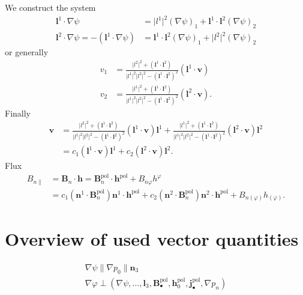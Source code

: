 \documentclass[a4paper, 10pt, english]{article}
\let\temp\vartheta
\let\vartheta\theta
\let\theta\temp
\let\temp\varphi
\let\varphi\phi
\let\phi\temp
\let\vec\symbf
\newcommand*\pol{\ensuremath{\textrm{pol}}}
\begin{document}
We construct the system
\begin{align*}
  \vec{l}^{1} \cdot \nabla \psi &= \lvert l^{1} \rvert^{2} (\nabla \psi)_{1} + \vec{l}^{1} \cdot \vec{l}^{2} (\nabla \psi)_{2} \\
  \vec{l}^{2} \cdot \nabla \psi = -(\vec{l}^{1} \cdot \nabla \psi) &= \vec{l}^{1} \cdot \vec{l}^{2} (\nabla \psi)_{1} + \lvert l^{2} \rvert^{2} (\nabla \psi)_{2}
\end{align*}
or generally
\begin{align*}
  v_{1} &= \frac{\lvert l^{2} \rvert^{2} + (\vec{l}^{1} \cdot \vec{l}^{2})}{\lvert l^{1} \rvert^{2} \lvert l^{2} \rvert^{2} - (\vec{l}^{1} \cdot \vec{l}^{2})^{2}} (\vec{l}^{1} \cdot \vec{v}) \\
  v_{2} &= \frac{\lvert l^{1} \rvert^{2} + (\vec{l}^{1} \cdot \vec{l}^{2})}{\lvert l^{1} \rvert^{2} \lvert l^{2} \rvert^{2} - (\vec{l}^{1} \cdot \vec{l}^{2})^{2}} (\vec{l}^{2} \cdot \vec{v}).
\end{align*}
Finally
\begin{align}
  \vec{v} &= \frac{\lvert l^{2} \rvert^{2} + (\vec{l}^{1} \cdot \vec{l}^{2})}{\lvert l^{1} \rvert^{2} \lvert l^{2} \rvert^{2} - (\vec{l}^{1} \cdot \vec{l}^{2})^{2}}(\vec{l}^{1} \cdot \vec{v}) \vec{l}^{1} + \frac{\lvert l^{1} \rvert^{2} + (\vec{l}^{1} \cdot \vec{l}^{2})}{\lvert l^{1} \rvert^{2} \lvert l^{2} \rvert^{2} - (\vec{l}^{1} \cdot \vec{l}^{2})^{2}}(\vec{l}^{2} \cdot \vec{v}) \vec{l}^{2} \\
  &= c_{1} (\vec{l}^{1} \cdot \vec{v}) \vec{l}^{1} + c_{2} (\vec{l}^{2} \cdot \vec{v}) \vec{l}^{2}.
\end{align}
Flux
\begin{align}
  B_{n \parallel} &= \vec{B}_{n} \cdot \vec{h} = \vec{B}_{n}^{\pol} \cdot \vec{h}^{\pol} + B_{n \phi} h^{\phi} \nonumber \\
  &= c_{1} (\vec{n}^{1} \cdot \vec{B}_{n}^{\pol}) \vec{n}^{1} \cdot \vec{h}^{\pol} + c_{2} (\vec{n}^{2} \cdot \vec{B}_{n}^{\pol}) \vec{n}^{2} \cdot \vec{h}^{\pol} + B_{n (\phi)} h_{(\phi)}.
\end{align}

\appendix
\section{Overview of used vector quantities}
\begin{gather*}
  \nabla \psi \parallel \nabla p_0 \parallel \vec{n}_3 \\
  \nabla \phi \perp \left( \nabla \psi, \dotsc, \vec{l}_3, \vec{B}_{\bullet}^{\pol}, \vec{h}_{0}^{\pol}, \vec{j}_{\bullet}^{\pol}, \nabla p_n \right)
\end{gather*}
\end{document}
